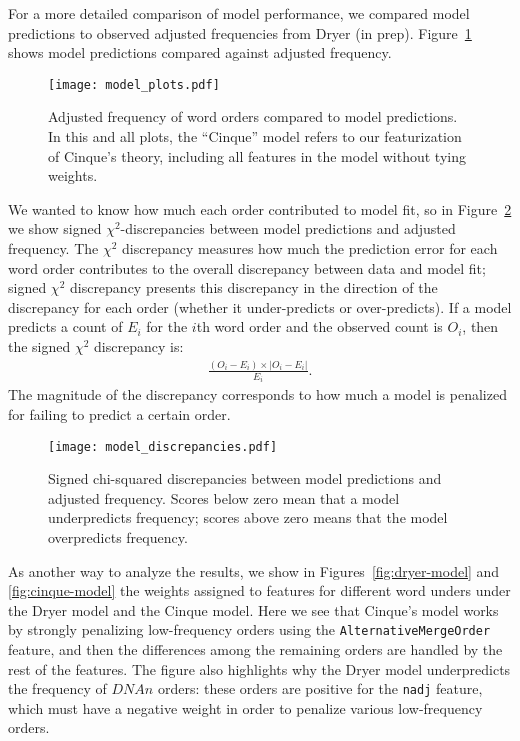 \documentclass[11pt]{article}
\newcommand{\alternativeMergeOrder}{\texttt{AlternativeMergeOrder}\xspace}
\begin{document}
For a more detailed comparison of model performance, we compared model predictions to observed adjusted frequencies from Dryer (in prep). Figure~\ref{fig:af-predictions} shows model predictions compared against adjusted frequency.

\begin{figure}[ht!]
  \centering
  \texttt{[image: model\_plots.pdf]}
  \caption{Adjusted frequency of word orders compared to model predictions. In this and all plots, the ``Cinque'' model refers to our featurization of Cinque's theory, including all features in the model without tying weights.}
  \label{fig:af-predictions}
\end{figure}


We wanted to know how much each order contributed to model fit, so in Figure~\ref{fig:af-discrepancies} we show signed $\chi^2$-discrepancies between model predictions and adjusted frequency. The $\chi^2$ discrepancy measures how much the prediction error for each word order contributes to the overall discrepancy between data and model fit; signed $\chi^2$ discrepancy presents this discrepancy in the direction of the discrepancy for each order (whether it under-predicts or over-predicts).
If a model predicts a count of $E_i$ for the $i$th word order and the observed count is $O_i$, then the signed $\chi^2$ discrepancy is:
\begin{align}
  \nonumber
  \frac{(O_i - E_i) \times |O_i - E_i|}
       {E_i}.
\end{align}
The magnitude of the discrepancy corresponds to how much a model is penalized for failing to predict a certain order.

\begin{figure}[ht!]
  \centering
  \texttt{[image: model\_discrepancies.pdf]}
  \caption{Signed chi-squared discrepancies between model predictions and adjusted frequency. Scores below zero mean that a model underpredicts frequency; scores above zero means that the model overpredicts frequency.}
  \label{fig:af-discrepancies}
\end{figure}

As another way to analyze the results, we show in Figures~\ref{fig:dryer-model} and \ref{fig:cinque-model} the weights assigned to features for different word unders under the Dryer model and the Cinque model.
Here we see that Cinque's model works by strongly penalizing low-frequency orders using the \alternativeMergeOrder feature, and then the differences among the remaining orders are handled by the rest of the features.
The figure also highlights why the Dryer model underpredicts the frequency of $DNAn$ orders: these orders are positive for the \texttt{nadj} feature, which must have a negative weight in order to penalize various low-frequency orders.
\end{document}
